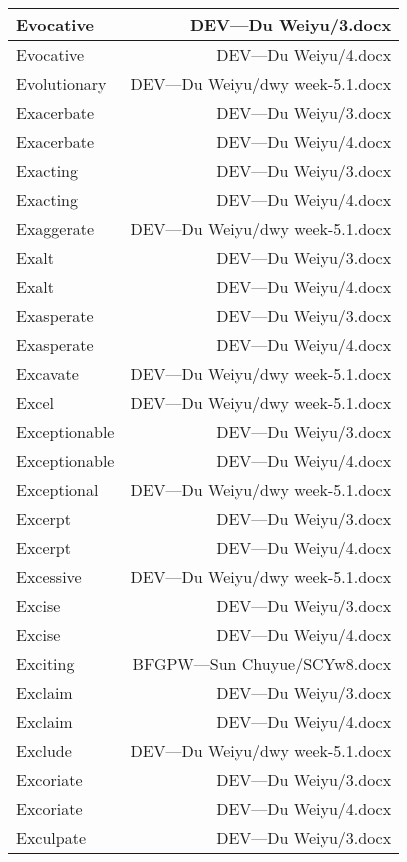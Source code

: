 \documentclass{article}
\begin{document}
\begin{center}
\begin{longtable}{|l|r|}
\hline
Evocative  &  DEV---Du Weiyu/3.docx\\  
\hline
Evocative  &  DEV---Du Weiyu/4.docx\\  
\hline
Evolutionary  &  DEV---Du Weiyu/dwy week-5.1.docx\\  
\hline
Exacerbate  &  DEV---Du Weiyu/3.docx\\  
\hline
Exacerbate  &  DEV---Du Weiyu/4.docx\\  
\hline
Exacting  &  DEV---Du Weiyu/3.docx\\  
\hline
Exacting  &  DEV---Du Weiyu/4.docx\\  
\hline
Exaggerate  &  DEV---Du Weiyu/dwy week-5.1.docx\\  
\hline
Exalt  &  DEV---Du Weiyu/3.docx\\  
\hline
Exalt  &  DEV---Du Weiyu/4.docx\\  
\hline
Exasperate  &  DEV---Du Weiyu/3.docx\\  
\hline
Exasperate  &  DEV---Du Weiyu/4.docx\\  
\hline
Excavate  &  DEV---Du Weiyu/dwy week-5.1.docx\\  
\hline
Excel  &  DEV---Du Weiyu/dwy week-5.1.docx\\  
\hline
Exceptionable  &  DEV---Du Weiyu/3.docx\\  
\hline
Exceptionable  &  DEV---Du Weiyu/4.docx\\  
\hline
Exceptional  &  DEV---Du Weiyu/dwy week-5.1.docx\\  
\hline
Excerpt  &  DEV---Du Weiyu/3.docx\\  
\hline
Excerpt  &  DEV---Du Weiyu/4.docx\\  
\hline
Excessive  &  DEV---Du Weiyu/dwy week-5.1.docx\\  
\hline
Excise  &  DEV---Du Weiyu/3.docx\\  
\hline
Excise  &  DEV---Du Weiyu/4.docx\\  
\hline
Exciting  &  BFGPW---Sun Chuyue/SCYw8.docx\\  
\hline
Exclaim  &  DEV---Du Weiyu/3.docx\\  
\hline
Exclaim  &  DEV---Du Weiyu/4.docx\\  
\hline
Exclude  &  DEV---Du Weiyu/dwy week-5.1.docx\\  
\hline
Excoriate  &  DEV---Du Weiyu/3.docx\\  
\hline
Excoriate  &  DEV---Du Weiyu/4.docx\\  
\hline
Exculpate  &  DEV---Du Weiyu/3.docx\\  
\hline

\end{longtable}
\end{center}
\end{document}
